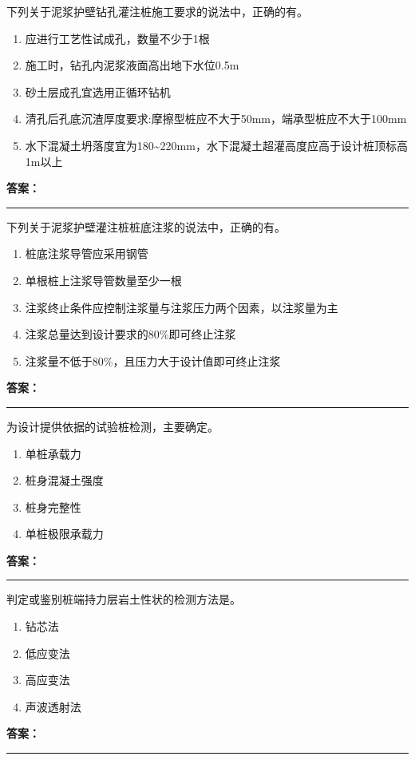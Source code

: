 \documentclass[UTF8,fontset=fandol,11pt]{ctexart}
\newcommand{\answerline}{\textcolor{answerred}{\rule{2.4cm}{0.7pt}}}
\begin{document}
\begin{quizbox}[title={第 3 题}]
下列关于泥浆护壁钻孔灌注桩施工要求的说法中，正确的有。\\
\begin{enumerate}[label=\Alph*.]
\item 应进行工艺性试成孔，数量不少于1根
\item 施工时，钻孔内泥浆液面高出地下水位0.5m
\item 砂土层成孔宜选用正循环钻机
\item 清孔后孔底沉渣厚度要求:摩擦型桩应不大于50mm，端承型桩应不大于100mm
\item 水下混凝土坍落度宜为180\textasciitilde{}220mm，水下混凝土超灌高度应高于设计桩顶标高1m以上
\end{enumerate}
\textbf{\textcolor{answerred}{答案：}} \answerline
\end{quizbox}

\begin{quizbox}[title={第 4 题}]
下列关于泥浆护壁灌注桩桩底注浆的说法中，正确的有。\\
\begin{enumerate}[label=\Alph*.]
\item 桩底注浆导管应采用钢管
\item 单根桩上注浆导管数量至少一根
\item 注浆终止条件应控制注浆量与注浆压力两个因素，以注浆量为主
\item 注浆总量达到设计要求的80\%即可终止注浆
\item 注浆量不低于80\%，且压力大于设计值即可终止注浆
\end{enumerate}
\textbf{\textcolor{answerred}{答案：}} \answerline
\end{quizbox}

\begin{quizbox}[title={第 5 题}]
为设计提供依据的试验桩检测，主要确定。\\
\begin{enumerate}[label=\Alph*.]
\item 单桩承载力
\item 桩身混凝土强度
\item 桩身完整性
\item 单桩极限承载力
\end{enumerate}
\textbf{\textcolor{answerred}{答案：}} \answerline
\end{quizbox}

\begin{quizbox}[title={第 6 题}]
判定或鉴别桩端持力层岩土性状的检测方法是。\\
\begin{enumerate}[label=\Alph*.]
\item 钻芯法
\item 低应变法
\item 高应变法
\item 声波透射法
\end{enumerate}
\textbf{\textcolor{answerred}{答案：}} \answerline
\end{quizbox}
\end{document}
